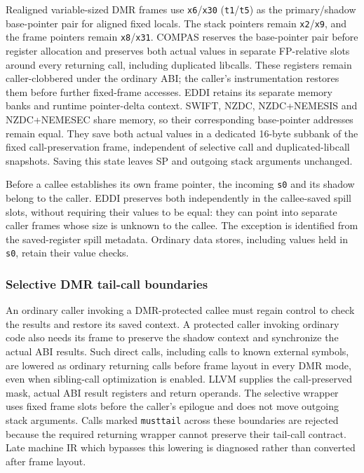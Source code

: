 Realigned variable-sized DMR frames use \texttt{x6}/\texttt{x30}
(\texttt{t1}/\texttt{t5}) as the primary/shadow base-pointer pair for aligned
fixed locals. The stack pointers remain \texttt{x2}/\texttt{x9}, and the frame
pointers remain \texttt{x8}/\texttt{x31}. COMPAS reserves the base-pointer pair
before register allocation and preserves both actual values in separate
FP-relative slots around every returning call, including duplicated libcalls.
These registers remain caller-clobbered under the ordinary ABI; the caller's
instrumentation restores them before further fixed-frame accesses.
EDDI retains its separate memory banks and runtime pointer-delta context.
SWIFT, NZDC, NZDC+NEMESIS and NZDC+NEMESEC share memory, so their corresponding
base-pointer addresses remain equal. They save both actual values in a dedicated
16-byte subbank of the fixed call-preservation frame, independent of selective
call and duplicated-libcall snapshots. Saving this state leaves SP and outgoing
stack arguments unchanged.

Before a callee establishes its own frame pointer, the incoming \texttt{s0}
and its shadow belong to the caller. EDDI preserves both independently in the
callee-saved spill slots, without requiring their values to be equal: they can
point into separate caller frames whose size is unknown to the callee. The
exception is identified from the saved-register spill metadata. Ordinary data
stores, including values held in \texttt{s0}, retain their value checks.

\subsubsection{Selective DMR tail-call boundaries}
An ordinary caller invoking a DMR-protected callee must regain control to check
the results and restore its saved context. A protected caller invoking ordinary
code also needs its frame to preserve the shadow context and synchronize the
actual ABI results. Such direct calls, including calls to known external
symbols, are lowered as ordinary returning calls before frame layout in every
DMR mode, even when sibling-call optimization is enabled. LLVM supplies the
call-preserved mask, actual ABI result registers and return operands. The
selective wrapper uses fixed frame slots before the caller's epilogue and does
not move outgoing stack arguments. Calls marked \texttt{musttail} across these
boundaries are rejected because the required returning wrapper cannot preserve
their tail-call contract. Late machine IR which bypasses this lowering is
diagnosed rather than converted after frame layout.


